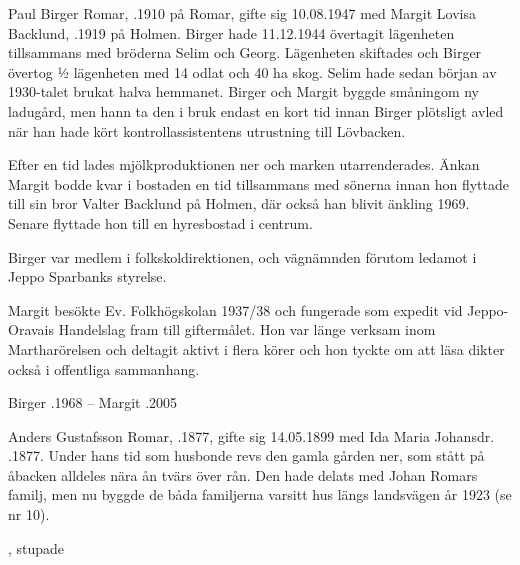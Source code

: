 
Paul Birger Romar, .1910 på Romar, gifte sig 10.08.1947 med Margit Lovisa Backlund, .1919 på Holmen. Birger hade 11.12.1944 övertagit lägenheten tillsammans med bröderna Selim och Georg. Lägenheten skiftades och Birger övertog ½ lägenheten med 14 odlat och 40 ha skog. Selim hade sedan början av 1930-talet brukat halva hemmanet. Birger och Margit byggde småningom ny ladugård, men hann ta den i bruk endast en kort tid innan Birger plötsligt avled när han hade kört kontrollassistentens utrustning till Lövbacken.

Efter en tid lades mjölkproduktionen ner och marken utarrenderades. Änkan Margit bodde kvar i bostaden en tid tillsammans med sönerna innan hon flyttade till sin bror Valter Backlund på Holmen, där också han blivit änkling 1969. Senare flyttade hon till en hyresbostad i centrum.

Birger var medlem i folkskoldirektionen, och vägnämnden förutom ledamot i Jeppo Sparbanks styrelse.

Margit besökte Ev. Folkhögskolan 1937/38 och fungerade som expedit vid Jeppo-Oravais Handelslag fram till giftermålet. Hon var länge verksam inom Martharörelsen och deltagit aktivt i flera körer och hon tyckte om att läsa dikter också i offentliga sammanhang.
\begin{jhchildren}
  \item {}
  \item {}
\end{jhchildren}

Birger .1968  --  Margit .2005


Anders Gustafsson Romar, .1877, gifte sig 14.05.1899 med Ida Maria Johansdr. .1877. Under hans tid som husbonde revs den gamla gården ner, som stått på åbacken alldeles nära ån tvärs över rån. Den hade delats med Johan Romars familj, men nu byggde de båda familjerna varsitt hus längs landsvägen år 1923 (se nr 10).
\begin{jhchildren}
  \item {}
  \item {}
  \item {}
  \item {}, stupade
  \item {}
  \item {}
\end{jhchildren}

